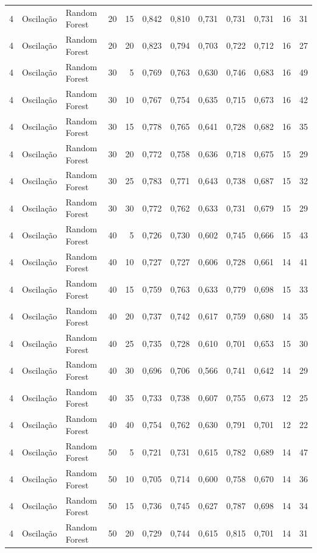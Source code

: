 \begin{longtable}{@{}rllrrrrrrrrr@{}}
4 & Oscilação & Random Forest & 20 & 15 & 0,842 & 0,810 & 0,731 & 0,731 & 0,731 & 16 & 31 \\
4 & Oscilação & Random Forest & 20 & 20 & 0,823 & 0,794 & 0,703 & 0,722 & 0,712 & 16 & 27 \\
4 & Oscilação & Random Forest & 30 & 5 & 0,769 & 0,763 & 0,630 & 0,746 & 0,683 & 16 & 49 \\
4 & Oscilação & Random Forest & 30 & 10 & 0,767 & 0,754 & 0,635 & 0,715 & 0,673 & 16 & 42 \\
4 & Oscilação & Random Forest & 30 & 15 & 0,778 & 0,765 & 0,641 & 0,728 & 0,682 & 16 & 35 \\
4 & Oscilação & Random Forest & 30 & 20 & 0,772 & 0,758 & 0,636 & 0,718 & 0,675 & 15 & 29 \\
4 & Oscilação & Random Forest & 30 & 25 & 0,783 & 0,771 & 0,643 & 0,738 & 0,687 & 15 & 32 \\
4 & Oscilação & Random Forest & 30 & 30 & 0,772 & 0,762 & 0,633 & 0,731 & 0,679 & 15 & 29 \\
4 & Oscilação & Random Forest & 40 & 5 & 0,726 & 0,730 & 0,602 & 0,745 & 0,666 & 15 & 43 \\
4 & Oscilação & Random Forest & 40 & 10 & 0,727 & 0,727 & 0,606 & 0,728 & 0,661 & 14 & 41 \\
4 & Oscilação & Random Forest & 40 & 15 & 0,759 & 0,763 & 0,633 & 0,779 & 0,698 & 15 & 33 \\
4 & Oscilação & Random Forest & 40 & 20 & 0,737 & 0,742 & 0,617 & 0,759 & 0,680 & 14 & 35 \\
4 & Oscilação & Random Forest & 40 & 25 & 0,735 & 0,728 & 0,610 & 0,701 & 0,653 & 15 & 30 \\
4 & Oscilação & Random Forest & 40 & 30 & 0,696 & 0,706 & 0,566 & 0,741 & 0,642 & 14 & 29 \\
4 & Oscilação & Random Forest & 40 & 35 & 0,733 & 0,738 & 0,607 & 0,755 & 0,673 & 12 & 25 \\
4 & Oscilação & Random Forest & 40 & 40 & 0,754 & 0,762 & 0,630 & 0,791 & 0,701 & 12 & 22 \\
4 & Oscilação & Random Forest & 50 & 5 & 0,721 & 0,731 & 0,615 & 0,782 & 0,689 & 14 & 47 \\
4 & Oscilação & Random Forest & 50 & 10 & 0,705 & 0,714 & 0,600 & 0,758 & 0,670 & 14 & 36 \\
4 & Oscilação & Random Forest & 50 & 15 & 0,736 & 0,745 & 0,627 & 0,787 & 0,698 & 14 & 34 \\
4 & Oscilação & Random Forest & 50 & 20 & 0,729 & 0,744 & 0,615 & 0,815 & 0,701 & 14 & 31 \\

\end{longtable}
